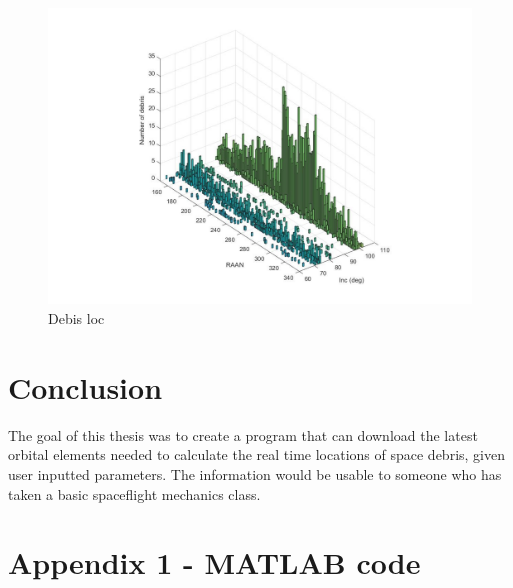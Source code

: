 \documentclass[12pt]{report}
\begin{document}
		\begin{figure}[!]
			\centering
			\includegraphics[width=0.7\linewidth]{rann_inc}
			\caption{Debis loc}
			\label{fig:ranninc}
		\end{figure}
		
	
	\section{Conclusion}
	The goal of this thesis was to create a program that can download the latest orbital elements needed to calculate the real time locations of space debris, given user inputted parameters. The information would be usable to someone who has taken a basic spaceflight mechanics class. 
	

	
		
		
		
		

		
		\newpage
		\singlespacing
		\section*{Appendix 1 - MATLAB code}
		
		
\end{document}

